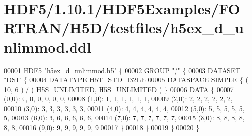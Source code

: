 \hypertarget{_h_d_f5_21_810_81_2_h_d_f5_examples_2_f_o_r_t_r_a_n_2_h5_d_2testfiles_2h5ex__d__unlimmod_8ddl_source}{}\section{H\+D\+F5/1.10.1/\+H\+D\+F5\+Examples/\+F\+O\+R\+T\+R\+A\+N/\+H5\+D/testfiles/h5ex\+\_\+d\+\_\+unlimmod.ddl}
\label{_h_d_f5_21_810_81_2_h_d_f5_examples_2_f_o_r_t_r_a_n_2_h5_d_2testfiles_2h5ex__d__unlimmod_8ddl_source}

\begin{DoxyCode}
00001 \hyperlink{namespace_h_d_f5}{HDF5} \textcolor{stringliteral}{"h5ex\_d\_unlimmod.h5"} \{
00002 GROUP \textcolor{stringliteral}{"/"} \{
00003    DATASET \textcolor{stringliteral}{"DS1"} \{
00004       DATATYPE  H5T\_STD\_I32LE
00005       DATASPACE  SIMPLE \{ ( 10, 6 ) / ( H5S\_UNLIMITED, H5S\_UNLIMITED ) \}
00006       DATA \{
00007       (0,0): 0, 0, 0, 0, 0, 0,
00008       (1,0): 1, 1, 1, 1, 1, 1,
00009       (2,0): 2, 2, 2, 2, 2, 2,
00010       (3,0): 3, 3, 3, 3, 3, 3,
00011       (4,0): 4, 4, 4, 4, 4, 4,
00012       (5,0): 5, 5, 5, 5, 5, 5,
00013       (6,0): 6, 6, 6, 6, 6, 6,
00014       (7,0): 7, 7, 7, 7, 7, 7,
00015       (8,0): 8, 8, 8, 8, 8, 8,
00016       (9,0): 9, 9, 9, 9, 9, 9
00017       \}
00018    \}
00019 \}
00020 \}
\end{DoxyCode}
